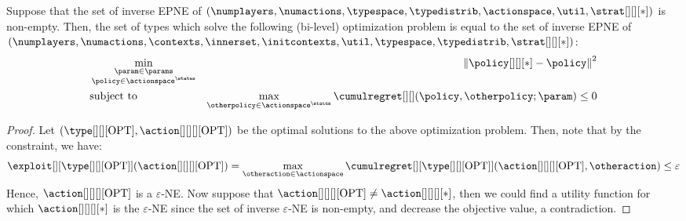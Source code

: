 




\begin{observation}\label{obs:bne}
    Suppose that the set of inverse EPNE of  $(\numplayers, \numactions, \typespace, \typedistrib, \actionspace, \util, \strat[][][*])$ is non-empty. Then, the set of types which solve the following (bi-level) optimization problem is equal to the set of inverse EPNE of $(\numplayers, \numactions, \contexts, \innerset, \initcontexts, \util, \typespace, \typedistrib, \strat[][][*])$:
    \begin{align}
        & \min_{\substack{\param \in \params \\ \policy \in \actionspace^\states}} &\left\|\policy[][][*] - \policy \right\|^2\\
        &\text{subject to } & \max_{\otherpolicy \in \actionspace^\states} \cumulregret[][](\policy, \otherpolicy; \param) \leq 0
    \end{align}
\end{observation}

\begin{proof}

     Let $(\type[][][\mathrm{OPT}], \action[][][][\mathrm{OPT}])$ be the optimal solutions to the above optimization problem. Then, note that by the constraint, we have:
    \begin{align}
         \exploit[][{\type[][][\mathrm{OPT}]}](\action[][][][\mathrm{OPT}]) =  \max_{\otheraction \in \actionspace}\cumulregret[][{\type[][][\mathrm{OPT}]}](\action[][][][\mathrm{OPT}], \otheraction) \leq \varepsilon
    \end{align}
    Hence, $\action[][][][\mathrm{OPT}]$ is a $\varepsilon$-NE. Now suppose that $\action[][][][\mathrm{OPT}] \neq \action[][][][*]$, then we could find a utility function for which $\action[][][][*]$ is the $\varepsilon$-NE since the set of inverse $\varepsilon$-NE is non-empty, and decrease the objective value, a contradiction.
\end{proof}

